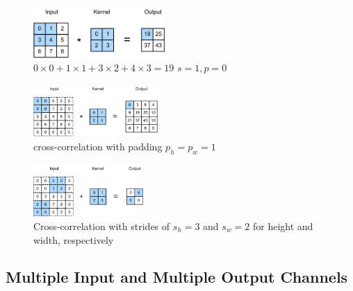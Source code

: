 \begin{table}[H]
    \begin{minipage}{0.3\linewidth}
        \begin{figure}[H]
            \centering
            \includegraphics[width=\linewidth, height=2cm, keepaspectratio]{Pictures/convolutional-neural-network/Cross-Correlation-Operation.jpg}
            \caption*{$0\times0+1\times1+3\times2+4\times3=19$ $s=1, p=0$ \cite{dnn-1}}
        \end{figure}
    \end{minipage}
    \hfill
    \begin{minipage}{0.3\linewidth}
        \begin{figure}[H]
            \centering
            \includegraphics[width=\linewidth, height=2cm, keepaspectratio]{Pictures/convolutional-neural-network/conv-pad.jpg}
            \caption*{cross-correlation with padding $p_h=p_w=1$ \cite{dnn-1}}
        \end{figure}
    \end{minipage}
    \hfill
    \begin{minipage}{0.3\linewidth}
        \begin{figure}[H]
            \centering
            \includegraphics[width=\linewidth, height=2cm, keepaspectratio]{Pictures/convolutional-neural-network/conv-stride.jpg}
            \caption*{Cross-correlation with strides of $s_h=3$ and $s_w=2$ for height and width, respectively \cite{dnn-1}}
        \end{figure}
    \end{minipage}
\end{table}


\subsection{Multiple Input and Multiple Output Channels \cite{dnn-1}}

